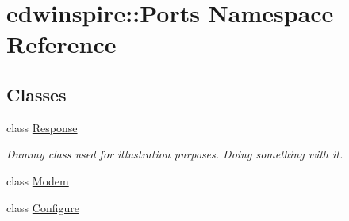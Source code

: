 \hypertarget{namespaceedwinspire_1_1_ports}{\section{edwinspire\-:\-:Ports Namespace Reference}
\label{namespaceedwinspire_1_1_ports}
}
\subsection*{Classes}
\begin{DoxyCompactItemize}
\item 
class \hyperlink{classedwinspire_1_1_ports_1_1_response}{Response}
\begin{DoxyCompactList}\small\item\em Dummy class used for illustration purposes. Doing something with it. \end{DoxyCompactList}\item 
class \hyperlink{classedwinspire_1_1_ports_1_1_modem}{Modem}
\item 
class \hyperlink{classedwinspire_1_1_ports_1_1_configure}{Configure}
\end{DoxyCompactItemize}
